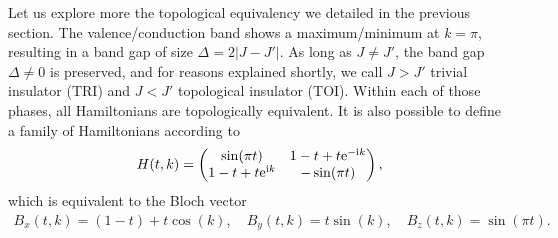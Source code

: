Let us explore more the topological equivalency we detailed in the previous section.
The valence/conduction band shows a maximum/minimum at $k=\pi$, resulting in a band gap of size $\Delta = 2\left|J-J'\right|$.
As long as $J\neq J'$, the band gap $\Delta\neq0$ is preserved, and for reasons explained shortly, we call $J>J'$ trivial insulator (TRI) and $J<J'$ topological insulator (TOI).
Within each of those phases, all Hamiltonians are topologically equivalent.
It is also possible to define a family of Hamiltonians according to
\begin{align}
    H(t,k) =
    \begin{pmatrix}
        \sin(\pi t) & 1-t + t\mathrm e^{-\mathrm i k} \\
        1-t + t\mathrm e^{\mathrm i k} & -\sin(\pi t)
    \end{pmatrix},
    \label{eq:hamiltonian_path}
\end{align}
which is equivalent to the Bloch vector
\begin{align}
    B_x(t,k) = (1-t)+t\cos(k),
    \quad
    B_y(t,k) = t\sin(k),
    \quad
    B_z(t,k) = \sin(\pi t).
\end{align}
